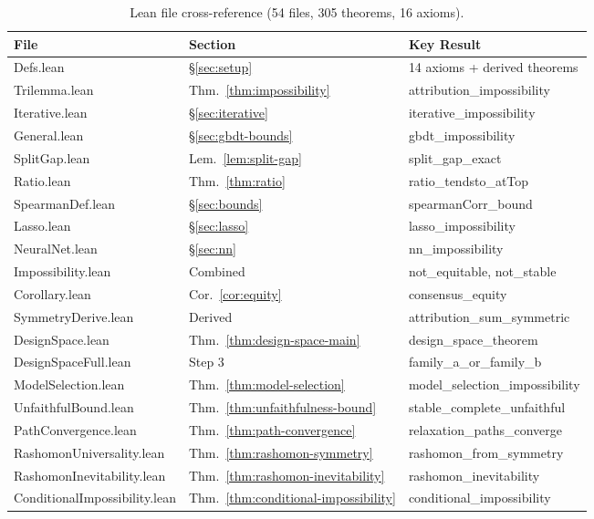 \documentclass{article}
\begin{document}
\begin{table}[t]
\centering
\caption{Lean file cross-reference (54 files, 305 theorems, 16 axioms).}
\label{tab:lean-crossref}
\footnotesize
\begin{tabular}{@{}lll@{}}
\toprule
\textbf{File} & \textbf{Section} & \textbf{Key Result} \\
\midrule
Defs.lean & \S\ref{sec:setup} & 14 axioms + derived theorems \\
Trilemma.lean & Thm.~\ref{thm:impossibility} & attribution\_impossibility \\
Iterative.lean & \S\ref{sec:iterative} & iterative\_impossibility \\
General.lean & \S\ref{sec:gbdt-bounds} & gbdt\_impossibility \\
SplitGap.lean & Lem.~\ref{lem:split-gap} & split\_gap\_exact \\
Ratio.lean & Thm.~\ref{thm:ratio} & ratio\_tendsto\_atTop \\
SpearmanDef.lean & \S\ref{sec:bounds} & spearmanCorr\_bound \\
Lasso.lean & \S\ref{sec:lasso} & lasso\_impossibility \\
NeuralNet.lean & \S\ref{sec:nn} & nn\_impossibility \\
Impossibility.lean & Combined & not\_equitable, not\_stable \\
Corollary.lean & Cor.~\ref{cor:equity} & consensus\_equity \\
SymmetryDerive.lean & Derived & attribution\_sum\_symmetric \\
DesignSpace.lean & Thm.~\ref{thm:design-space-main} & design\_space\_theorem \\
DesignSpaceFull.lean & Step 3 & family\_a\_or\_family\_b \\
ModelSelection.lean & Thm.~\ref{thm:model-selection} & model\_selection\_impossibility \\
UnfaithfulBound.lean & Thm.~\ref{thm:unfaithfulness-bound} & stable\_complete\_unfaithful \\
PathConvergence.lean & Thm.~\ref{thm:path-convergence} & relaxation\_paths\_converge \\
RashomonUniversality.lean & Thm.~\ref{thm:rashomon-symmetry} & rashomon\_from\_symmetry \\
RashomonInevitability.lean & Thm.~\ref{thm:rashomon-inevitability} & rashomon\_inevitability \\
ConditionalImpossibility.lean & Thm.~\ref{thm:conditional-impossibility} & conditional\_impossibility \\

\end{tabular}
\end{table}
\end{document}

